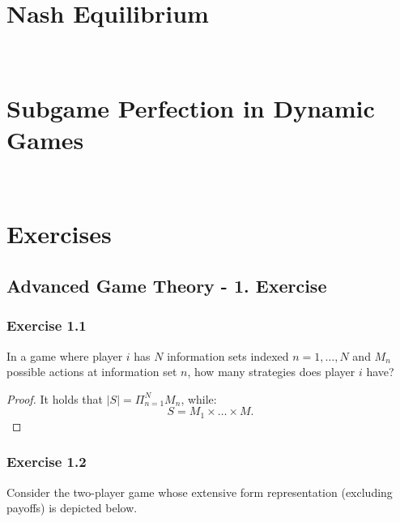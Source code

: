 \documentclass[12pt]{extreport} %
\theoremstyle{named}
\theoremstyle{itshape}
\theoremstyle{normal}
\begin{document}
~\newpage

\section{Nash Equilibrium}
 
~\newpage 
 
\section{Subgame Perfection in Dynamic Games}

~\newpage


\section{Exercises}

\subsection*{Advanced Game Theory - 1. Exercise}

\subsubsection*{Exercise 1.1}

In a game where player $i$ has $N$ information sets indexed $n = 1, \dotsc, N$ and $M_n$ possible actions at information set $n$, how many strategies does player $i$ have?

	\begin{proof}
		It holds that $|S| = \Pi_{n=1}^{N} M_{n}$, while:
		$$ S = M_{1} \times \dots \times M. $$
	\end{proof}

\subsubsection*{Exercise 1.2}	
	Consider the two-player game whose extensive form representation (excluding payoffs) is depicted below.
\end{document}
